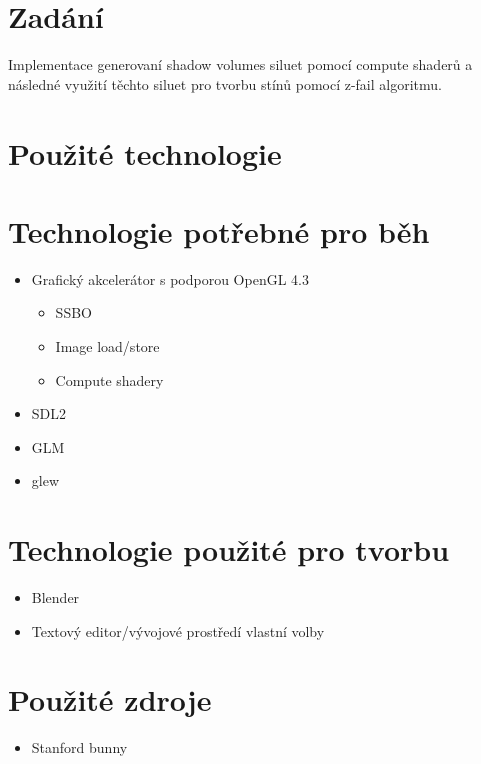 \documentclass[11pt,a4paper]{article}
\begin{document}
\titlepageandcontents

\section{Zadání}

Implementace generovaní shadow volumes siluet pomocí compute shaderů a následné využití těchto siluet
pro tvorbu stínů pomocí z-fail algoritmu.

\section{Použité technologie}

\section{Technologie potřebné pro běh}
\begin{itemize}
	\item Grafický akcelerátor s podporou OpenGL 4.3
		\begin{itemize}
			\item SSBO
			\item Image load/store
			\item Compute shadery
		\end{itemize}
	\item SDL2
	\item GLM
	\item glew
\end{itemize}

\section{Technologie použité pro tvorbu}
\begin{itemize}
	\item Blender
	\item Textový editor/vývojové prostředí vlastní volby
\end{itemize}

\section{Použité zdroje}
	\begin{itemize}
		\item Stanford bunny
	\end{itemize}
\end{document}
